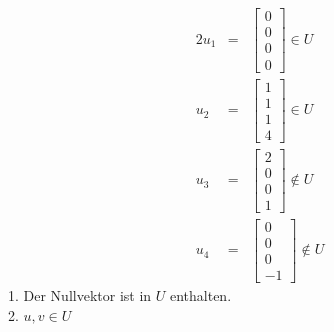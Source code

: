 \documentclass[10pt,a4paper,oneside,ngerman,numbers=noenddot]{scrartcl}
\begin{document}
\subsection{} %
\begin{alignat*}{2}
u_{1} &=& \begin{bmatrix}
0 \\
0 \\
0 \\
0
\end{bmatrix} \in U \\
u_{2} &=& \begin{bmatrix}
1 \\
1 \\
1 \\
4
\end{bmatrix} \in U \\
u_{3} &=& \begin{bmatrix}
2 \\
0 \\
0 \\
1
\end{bmatrix} \not\in U \\
u_{4} &=& \begin{bmatrix}
0 \\
0 \\
0 \\
-1
\end{bmatrix} \not\in U
\end{alignat*}
1. Der Nullvektor ist in $U$ enthalten. \\
2. $u,v \in U$
\end{document}
